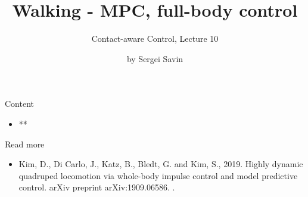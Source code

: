 \documentclass{beamer}
\title{Walking - MPC, full-body control}
\subtitle{Contact-aware Control, Lecture 10}
\author{by Sergei Savin}
\date{\mydate}
\begin{document}
\maketitle


\begin{frame}{Content}

\begin{itemize}
\item **
\end{itemize}

\end{frame}










\begin{frame}{Read more}
	\begin{itemize}
		\item Kim, D., Di Carlo, J., Katz, B., Bledt, G. and Kim, S., 2019. Highly dynamic quadruped locomotion via whole-body impulse control and model predictive control. arXiv preprint arXiv:1909.06586. .
		
		 
	\end{itemize}
\end{frame}



\myqrframe
\end{document}
